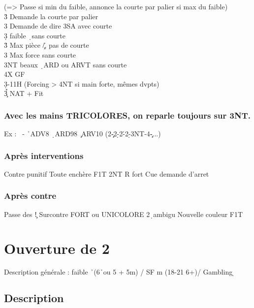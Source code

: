 \documentclass[a4paper]{article}
\begin{document}
\begin{bidtable}
\>(=> Passe si min du faible, annonce la courte par palier si max du faible)\\
3\h \> Demande la courte par palier\\
3\s \> Demande de dire 3SA avec courte \s \-\\
3\d \> faible \d\ sans courte\\
3\h \> Max pièce \c /\h , pas de courte\\
3\s \> Max force sans courte\\
3NT \> beaux \d\ ARD ou ARVT sans courte\\
4X \> GF\-\\
3\d {}-11H (Forcing > 4NT si main forte, mêmes dvpts)\\
3\h{}\c \> NAT + Fit\-
\end{bidtable}

\subsubsection{Avec les mains TRICOLORES, on reparle toujours sur 3NT.}

Ex : \s\ - \h\ ADV8 \d\ ARD98 \c\ ARV10
(2\c -2\d -2\h -2\d -3NT-4\c -...)

\subsubsection{Après interventions}

Contre punitif
Toute enchère F1T
2NT R fort
Cue demande d'arret

\subsubsection{Après contre}

Passe des \c !
Surcontre FORT ou UNICOLORE
2\d\ ambigu
Nouvelle couleur F1T

\newpage

\section{Ouverture de 2\pdfd}

Description générale : faible \h\ (6\h\ ou 5 + 5m) / SF m (18-21 6+)/ Gambling \d 

\subsection{Description}
\end{document}
